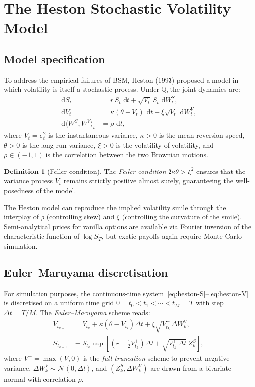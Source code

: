 \documentclass[12pt, a4paper]{report}
\theoremstyle{definition}
\newtheorem{definition}{Definition}[chapter]
\newcommand{\Q}{\mathbb{Q}}
\newcommand{\dd}{\,\mathrm{d}}
\begin{document}
\section{The Heston Stochastic Volatility Model}

\subsection{Model specification}

To address the empirical failures of BSM, Heston (1993) proposed a model
in which volatility is itself a stochastic process.  Under $\Q$, the
joint dynamics are:
\begin{align}
  \dd S_t &= r\,S_t\,\dd t + \sqrt{V_t}\,S_t\,\dd W_t^S, \label{eq:heston-S}\\
  \dd V_t &= \kappa(\theta - V_t)\,\dd t + \xi\sqrt{V_t}\,\dd W_t^V, \label{eq:heston-V}\\
  \dd\langle W^S, W^V\rangle_t &= \rho\,\dd t, \label{eq:heston-corr}
\end{align}
where $V_t = \sigma_t^2$ is the instantaneous variance, $\kappa > 0$ is
the mean-reversion speed, $\theta > 0$ is the long-run variance,
$\xi > 0$ is the volatility of volatility, and $\rho \in (-1, 1)$ is
the correlation between the two Brownian motions.

\begin{definition}[Feller condition]
The \emph{Feller condition} $2\kappa\theta > \xi^2$ ensures that the
variance process $V_t$ remains strictly positive almost surely,
guaranteeing the well-posedness of the model.
\end{definition}

The Heston model can reproduce the implied volatility smile through the
interplay of $\rho$ (controlling skew) and $\xi$ (controlling the
curvature of the smile).  Semi-analytical prices for vanilla options are
available via Fourier inversion of the characteristic function of
$\log S_T$, but exotic payoffs again require Monte Carlo simulation.

\subsection{Euler--Maruyama discretisation}

For simulation purposes, the continuous-time
system~\eqref{eq:heston-S}--\eqref{eq:heston-V} is discretised on a
uniform time grid $0 = t_0 < t_1 < \cdots < t_M = T$ with step
$\Delta t = T/M$.  The \emph{Euler--Maruyama} scheme reads:
\begin{align*}
  V_{t_{k+1}} &= V_{t_k} + \kappa(\theta - V_{t_k})\Delta t
                 + \xi\sqrt{V_{t_k}^+}\,\Delta W^V_k,\\
  S_{t_{k+1}} &= S_{t_k}\exp\!\left[\left(r - \tfrac{1}{2}V_{t_k}^+\right)\Delta t
                 + \sqrt{V_{t_k}^+\,\Delta t}\,Z_k^S\right],
\end{align*}
where $V^+ = \max(V,0)$ is the \emph{full truncation} scheme to prevent
negative variance, $\Delta W^V_k \sim \mathcal{N}(0,\Delta t)$, and
$(Z_k^S, \Delta W^V_k)$ are drawn from a bivariate normal with
correlation $\rho$.
\end{document}
